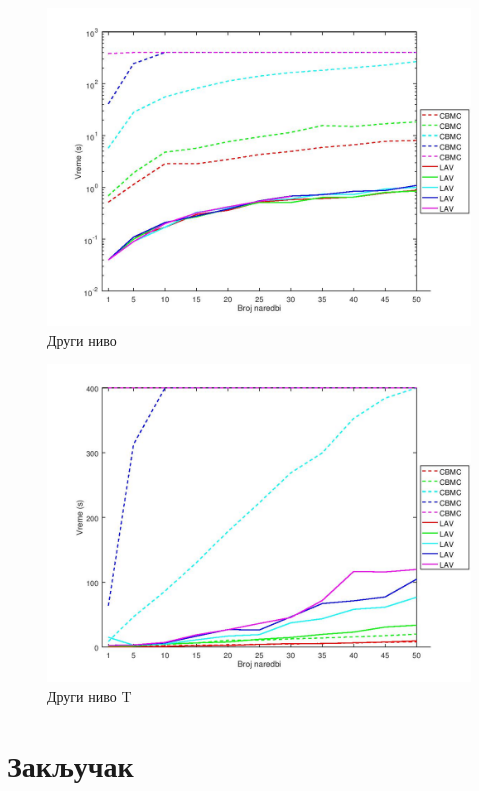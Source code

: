 \documentclass[12pt,oneside]{memoir}
\begin{document}
\begin{figure}[!ht]
  \centering
  \includegraphics[width=1.0\textwidth]{img/nivo_2a.jpg}
  \caption{Други ниво}
  \label{fig:nivo_2}
\end{figure}

\begin{figure}[!ht]
  \centering
  \includegraphics[width=1.0\textwidth]{img/nivo_2Ta.jpg}
  \caption{Други ниво T}
  \label{fig:nivo_2t}
\end{figure}


\chapter{Закључак} 
\literatura
\backmatter
\end{document}
